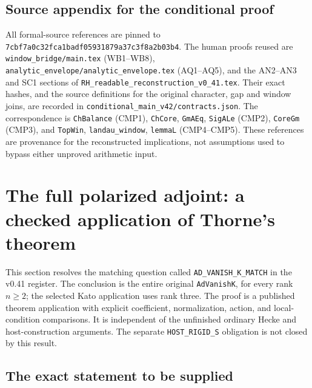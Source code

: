 \subsection{Source appendix for the conditional proof}

All formal-source references are pinned to
\texttt{7cbf7a0c32fca1badf05931879a37c3f8a2b03b4}.
The human proofs reused are
\texttt{window\_bridge/main.tex} (WB1--WB8),
\texttt{analytic\_envelope/analytic\_envelope.tex} (AQ1--AQ5),
and the AN2--AN3 and SC1 sections of
\texttt{RH\_readable\_reconstruction\_v0\_41.tex}.
Their exact hashes, and the source definitions for the original
character, gap and window joins, are recorded in
\texttt{conditional\_main\_v42/contracts.json}.
The correspondence is
\texttt{ChBalance} (CMP1),
\texttt{ChCore}, \texttt{GmAEq}, \texttt{SigALe} (CMP2),
\texttt{CoreGm} (CMP3), and
\texttt{TopWin}, \texttt{landau\_window}, \texttt{lemmaL}
(CMP4--CMP5).  These references are provenance for the
reconstructed implications, not assumptions used to bypass either
unproved arithmetic input.


\section{The full polarized adjoint: a checked application of Thorne's theorem}
\label{sec:adk-match}

This section resolves the matching question called
\texttt{AD\_VANISH\_K\_MATCH} in the v0.41 register.  The conclusion is
the entire original \texttt{AdVanishK}, for every rank $n\ge2$; the
selected Kato application uses rank three.  The proof is a published
theorem application with explicit coefficient, normalization, action,
and local-condition comparisons.  It is independent of the unfinished
ordinary Hecke and host-construction arguments.  The separate
\texttt{HOST\_RIGID\_S} obligation is not closed by this result.

\subsection{The exact statement to be supplied}

